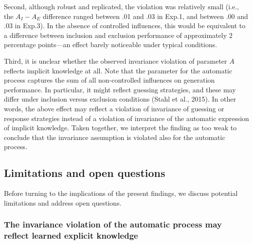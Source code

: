 \documentclass[floatsintext,man]{apa6}
\begin{document}
Second, although robust and replicated, the violation was relatively
small (i.e., the \(A_{I}-A_{E}\) difference ranged between .01 and .03
in Exp.1, and between .00 and .03 in Exp.3). In the absence of
controlled influences, this would be equivalent to a difference between
inclusion and exclusion performance of approximately 2 percentage
points---an effect barely noticeable under typical conditions.

Third, it is unclear whether the observed invariance violation of
parameter \(A\) reflects implicit knowledge at all. Note that the
parameter for the automatic process captures the sum of all
non-controlled influences on generation performance. In particular, it
might reflect guessing strategies, and these may differ under inclusion
versus exclusion conditions (Stahl et al., 2015). In other words, the
above effect may reflect a violation of invariance of guessing or
response strategies instead of a violation of invariance of the
automatic expression of implicit knowledge. Taken together, we interpret
the finding as too weak to conclude that the invariance assumption is
violated also for the automatic process.

\subsection{Limitations and open
questions}\label{limitations-and-open-questions}

Before turning to the implications of the present findings, we discuss
potential limitations and address open questions.

\subsubsection{The invariance violation of the automatic process may
reflect learned explicit
knowledge}\label{the-invariance-violation-of-the-automatic-process-may-reflect-learned-explicit-knowledge}
\end{document}
